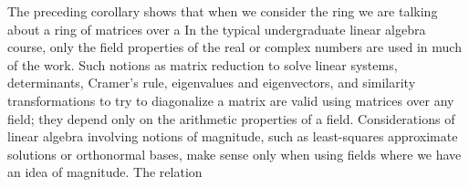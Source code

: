 \documentclass[11pt,oneside]{article}
\begin{document}
\begin{BookBody}
The preceding corollary shows that when we consider the ring  we are talking about a ring of matrices over a  In the typical undergraduate linear algebra course, only the field properties of the real or complex numbers are used in much of the work. Such notions as matrix reduction to solve linear systems, determinants, Cramer’s rule, eigenvalues and eigenvectors, and similarity transformations to try to diagonalize a matrix are valid using matrices over any field; they depend only on the arithmetic properties of a field. Considerations of linear algebra involving notions of magnitude, such 
as least-squares approximate solutions or orthonormal bases, make sense only when using fields where we have an idea of magnitude. The relation

\end{BookBody}

\BookNarrativetrue
\end{document}
